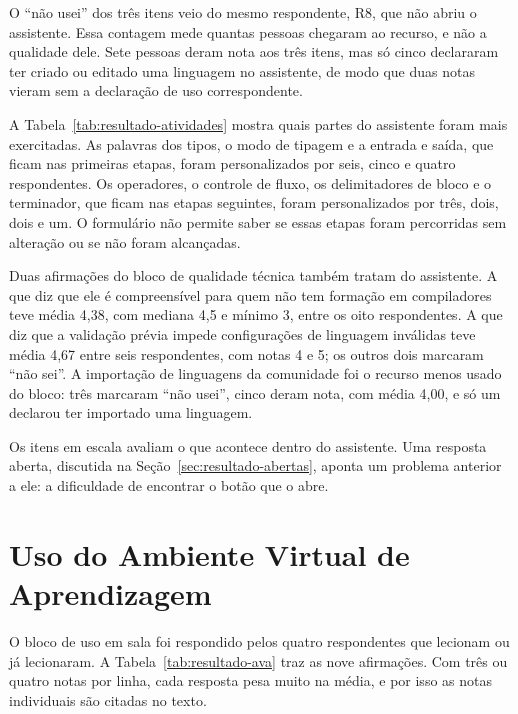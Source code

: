 O ``não usei'' dos três itens veio do mesmo respondente, R8, que não abriu o assistente. Essa contagem mede quantas pessoas chegaram ao recurso, e não a qualidade dele. Sete pessoas deram nota aos três itens, mas só cinco declararam ter criado ou editado uma linguagem no assistente, de modo que duas notas vieram sem a declaração de uso correspondente.

A Tabela~\ref{tab:resultado-atividades} mostra quais partes do assistente foram mais exercitadas. As palavras dos tipos, o modo de tipagem e a entrada e saída, que ficam nas primeiras etapas, foram personalizados por seis, cinco e quatro respondentes. Os operadores, o controle de fluxo, os delimitadores de bloco e o terminador, que ficam nas etapas seguintes, foram personalizados por três, dois, dois e um. O formulário não permite saber se essas etapas foram percorridas sem alteração ou se não foram alcançadas.

Duas afirmações do bloco de qualidade técnica também tratam do assistente. A que diz que ele é compreensível para quem não tem formação em compiladores teve média 4,38, com mediana 4,5 e mínimo 3, entre os oito respondentes. A que diz que a validação prévia impede configurações de linguagem inválidas teve média 4,67 entre seis respondentes, com notas 4 e 5; os outros dois marcaram ``não sei''. A importação de linguagens da comunidade foi o recurso menos usado do bloco: três marcaram ``não usei'', cinco deram nota, com média 4,00, e só um declarou ter importado uma linguagem.

Os itens em escala avaliam o que acontece dentro do assistente. Uma resposta aberta, discutida na Seção~\ref{sec:resultado-abertas}, aponta um problema anterior a ele: a dificuldade de encontrar o botão que o abre.

\section{Uso do Ambiente Virtual de Aprendizagem}
\label{sec:resultado-ava}

O bloco de uso em sala foi respondido pelos quatro respondentes que lecionam ou já lecionaram. A Tabela~\ref{tab:resultado-ava} traz as nove afirmações. Com três ou quatro notas por linha, cada resposta pesa muito na média, e por isso as notas individuais são citadas no texto.

